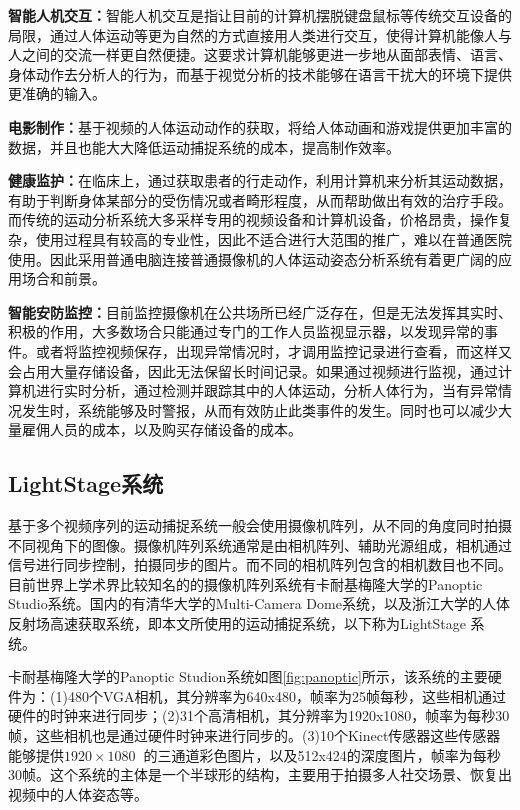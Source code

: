 \textbf{智能人机交互：}智能人机交互是指让目前的计算机摆脱键盘鼠标等传统交互设备的局限，通过人体运动等更为自然的方式直接用人类进行交互，使得计算机能像人与人之间的交流一样更自然便捷。这要求计算机能够更进一步地从面部表情、语言、身体动作去分析人的行为，而基于视觉分析的技术能够在语言干扰大的环境下提供更准确的输入。

\textbf{电影制作：}基于视频的人体运动动作的获取，将给人体动画和游戏提供更加丰富的数据，并且也能大大降低运动捕捉系统的成本，提高制作效率。

\textbf{健康监护：}在临床上，通过获取患者的行走动作，利用计算机来分析其运动数据，有助于判断身体某部分的受伤情况或者畸形程度，从而帮助做出有效的治疗手段。而传统的运动分析系统大多采样专用的视频设备和计算机设备，价格昂贵，操作复杂，使用过程具有较高的专业性，因此不适合进行大范围的推广，难以在普通医院使用。因此采用普通电脑连接普通摄像机的人体运动姿态分析系统有着更广阔的应用场合和前景。

\textbf{智能安防监控：}目前监控摄像机在公共场所已经广泛存在，但是无法发挥其实时、积极的作用，大多数场合只能通过专门的工作人员监视显示器，以发现异常的事件。或者将监控视频保存，出现异常情况时，才调用监控记录进行查看，而这样又会占用大量存储设备，因此无法保留长时间记录。如果通过视频进行监视，通过计算机进行实时分析，通过检测并跟踪其中的人体运动，分析人体行为，当有异常情况发生时，系统能够及时警报，从而有效防止此类事件的发生。同时也可以减少大量雇佣人员的成本，以及购买存储设备的成本。

\subsection{LightStage系统}
基于多个视频序列的运动捕捉系统一般会使用摄像机阵列，从不同的角度同时拍摄不同视角下的图像。摄像机阵列系统通常是由相机阵列、辅助光源组成，相机通过信号进行同步控制，拍摄同步的图片。而不同的相机阵列包含的相机数目也不同。目前世界上学术界比较知名的的摄像机阵列系统有卡耐基梅隆大学的Panoptic Studio系统。国内的有清华大学的Multi-Camera Dome系统，以及浙江大学的人体反射场高速获取系统，即本文所使用的运动捕捉系统，以下称为LightStage 系统。

卡耐基梅隆大学的Panoptic Studion系统\cite{Panoptic}如图\ref{fig:panoptic}所示，该系统的主要硬件为：(1)480个VGA相机，其分辨率为640x480，帧率为25帧每秒，这些相机通过硬件的时钟来进行同步；(2)31个高清相机，其分辨率为1920x1080，帧率为每秒30帧，这些相机也是通过硬件时钟来进行同步的。(3)10个Kinect传感器这些传感器能够提供\(1920\times 1080\)的三通道彩色图片，以及512x424的深度图片，帧率为每秒30帧。这个系统的主体是一个半球形的结构，主要用于拍摄多人社交场景、恢复出视频中的人体姿态等。

